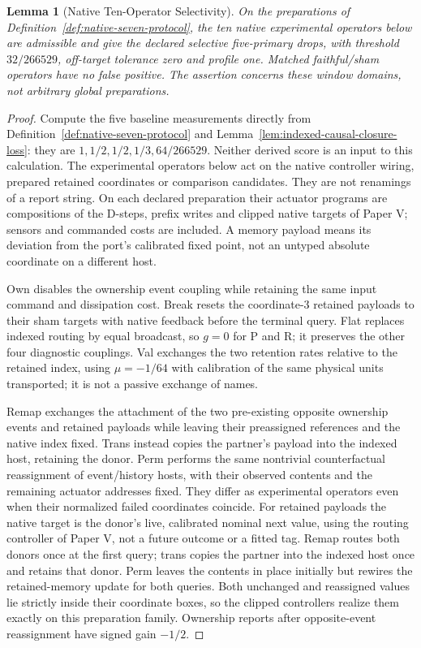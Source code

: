 \documentclass[11pt,a4paper]{article}
\newtheorem{lemma}[theorem]{Lemma}
\theoremstyle{definition}
\begin{document}
\begin{lemma}[Native Ten-Operator Selectivity]
\label{lem:native-intervention-selectivity}
On the preparations of Definition~\ref{def:native-seven-protocol}, the ten
native experimental operators below are admissible and give the declared
selective five-primary drops, with threshold $32/266529$, off-target tolerance
zero and profile one. Matched faithful/sham operators have no false positive.
The assertion concerns these window domains, not arbitrary global preparations.
\end{lemma}
\begin{proof}
Compute the five baseline measurements directly from
Definition~\ref{def:native-seven-protocol} and
Lemma~\ref{lem:indexed-causal-closure-loss}: they are
$1,1/2,1/2,1/3,64/266529$. Neither derived score is an input to this calculation.
The experimental operators below act on the native controller wiring,
prepared retained coordinates or comparison candidates. They are not
renamings of a report string. On each declared preparation their actuator
programs are compositions of the D-steps, prefix writes and clipped native
targets of Paper V; sensors and commanded costs are included. A memory payload
means its deviation from the port's calibrated fixed point, not an untyped
absolute coordinate on a different host.

Own disables the ownership event coupling while retaining the same input
command and dissipation cost. Break resets the coordinate-3 retained payloads
to their sham targets with native feedback before the terminal query. Flat
replaces indexed routing by equal broadcast, so $g=0$ for P and R; it preserves
the other four diagnostic couplings. Val exchanges the two retention rates
relative to the retained index, using $\mu=-1/64$ with calibration of the
same physical units transported; it is not a passive exchange of names.

Remap exchanges the attachment of the two pre-existing opposite ownership
events and retained payloads while leaving their preassigned references and
the native index fixed. Trans instead copies the partner's payload into the
indexed host, retaining the donor. Perm performs the same nontrivial
counterfactual reassignment of event/history hosts, with their observed
contents and the remaining actuator addresses fixed. They differ as
experimental operators even when their normalized failed coordinates coincide.
For retained payloads the native target is the donor's live, calibrated
nominal next value, using the routing controller of Paper V, not a future
outcome or a fitted tag. Remap routes both donors once at the first query;
trans copies the partner into the indexed host once and retains that donor.
Perm leaves the contents in place initially but rewires the retained-memory
update for both queries. Both unchanged and reassigned
values lie strictly inside their coordinate boxes, so the clipped controllers
realize them exactly on this preparation family. Ownership reports after
opposite-event reassignment have signed gain $-1/2$.


\end{proof}
\end{document}
